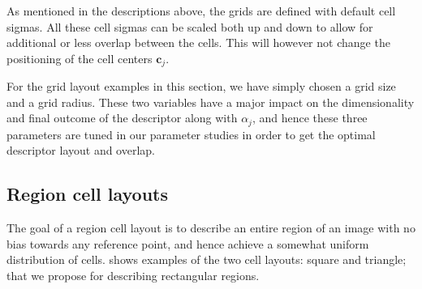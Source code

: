 \documentclass[thesis.tex]{subfiles}
\def\c{\mathbf{c}}
\begin{document}
As mentioned in the descriptions above, the grids are defined with default cell sigmas. All these cell sigmas can be scaled both up and down to allow for additional or less overlap between the cells. This will however not change the positioning of the cell centers $\c_j$.

For the grid layout examples in this section, we have simply chosen a grid size and a grid radius. These two variables have a major impact on the dimensionality and final outcome of the descriptor along with $\alpha_j$, and hence these three parameters are tuned in our parameter studies in order to get the optimal descriptor layout and overlap.

\subsection{Region cell layouts}
\label{sec:cellApertureFunctionRegion}

The goal of a region cell layout is to describe an entire region of an image with no bias towards any reference point, and hence achieve a somewhat uniform distribution of cells.
 shows examples of the two cell layouts: square and triangle; that we propose for describing rectangular regions.
\end{document}
